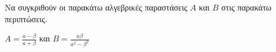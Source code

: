 Να συγκριθούν οι παρακάτω αλγεβρικές παραστάσεις $ A $ και $ B $ στις παρακάτω περιπτώσεις.
\begin{alist}
\item $ A=\frac{a-\beta}{a+\beta} $ και $ B=\frac{a\beta}{a^2-\beta^2} $
\item 
\item 
\item 
\end{alist}
